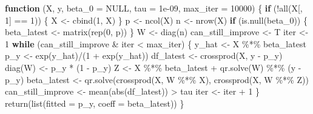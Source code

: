 \documentclass[
]{book}
\newenvironment{Shaded}{\begin{snugshade}}{\end{snugshade}}
\newcommand{\AttributeTok}[1]{\textcolor[rgb]{0.77,0.63,0.00}{#1}}
\newcommand{\ConstantTok}[1]{\textcolor[rgb]{0.00,0.00,0.00}{#1}}
\newcommand{\ControlFlowTok}[1]{\textcolor[rgb]{0.13,0.29,0.53}{\textbf{#1}}}
\newcommand{\DecValTok}[1]{\textcolor[rgb]{0.00,0.00,0.81}{#1}}
\newcommand{\FloatTok}[1]{\textcolor[rgb]{0.00,0.00,0.81}{#1}}
\newcommand{\FunctionTok}[1]{\textcolor[rgb]{0.00,0.00,0.00}{#1}}
\newcommand{\NormalTok}[1]{#1}
\newcommand{\OtherTok}[1]{\textcolor[rgb]{0.56,0.35,0.01}{#1}}
\newcommand{\SpecialCharTok}[1]{\textcolor[rgb]{0.00,0.00,0.00}{#1}}
\begin{document}
\begin{Shaded}
\begin{Highlighting}[]
\ControlFlowTok{function}\NormalTok{ (X, y, }\AttributeTok{beta\_0 =} \ConstantTok{NULL}\NormalTok{, }\AttributeTok{tau =} \FloatTok{1e{-}09}\NormalTok{, }\AttributeTok{max\_iter =} \DecValTok{10000}\NormalTok{) }
\NormalTok{\{}
    \ControlFlowTok{if}\NormalTok{ (}\SpecialCharTok{!}\FunctionTok{all}\NormalTok{(X[, }\DecValTok{1}\NormalTok{] }\SpecialCharTok{==} \DecValTok{1}\NormalTok{)) \{}
\NormalTok{        X }\OtherTok{\textless{}{-}} \FunctionTok{cbind}\NormalTok{(}\DecValTok{1}\NormalTok{, X)}
\NormalTok{    \}}
\NormalTok{    p }\OtherTok{\textless{}{-}} \FunctionTok{ncol}\NormalTok{(X)}
\NormalTok{    n }\OtherTok{\textless{}{-}} \FunctionTok{nrow}\NormalTok{(X)}
    \ControlFlowTok{if}\NormalTok{ (}\FunctionTok{is.null}\NormalTok{(beta\_0)) \{}
\NormalTok{        beta\_latest }\OtherTok{\textless{}{-}} \FunctionTok{matrix}\NormalTok{(}\FunctionTok{rep}\NormalTok{(}\DecValTok{0}\NormalTok{, p))}
\NormalTok{    \}}
\NormalTok{    W }\OtherTok{\textless{}{-}} \FunctionTok{diag}\NormalTok{(n)}
\NormalTok{    can\_still\_improve }\OtherTok{\textless{}{-}}\NormalTok{ T}
\NormalTok{    iter }\OtherTok{\textless{}{-}} \DecValTok{1}
    \ControlFlowTok{while}\NormalTok{ (can\_still\_improve }\SpecialCharTok{\&}\NormalTok{ iter }\SpecialCharTok{\textless{}}\NormalTok{ max\_iter) \{}
\NormalTok{        y\_hat }\OtherTok{\textless{}{-}}\NormalTok{ X }\SpecialCharTok{\%*\%}\NormalTok{ beta\_latest}
\NormalTok{        p\_y }\OtherTok{\textless{}{-}} \FunctionTok{exp}\NormalTok{(y\_hat)}\SpecialCharTok{/}\NormalTok{(}\DecValTok{1} \SpecialCharTok{+} \FunctionTok{exp}\NormalTok{(y\_hat))}
\NormalTok{        df\_latest }\OtherTok{\textless{}{-}} \FunctionTok{crossprod}\NormalTok{(X, y }\SpecialCharTok{{-}}\NormalTok{ p\_y)}
        \FunctionTok{diag}\NormalTok{(W) }\OtherTok{\textless{}{-}}\NormalTok{ p\_y }\SpecialCharTok{*}\NormalTok{ (}\DecValTok{1} \SpecialCharTok{{-}}\NormalTok{ p\_y)}
\NormalTok{        Z }\OtherTok{\textless{}{-}}\NormalTok{ X }\SpecialCharTok{\%*\%}\NormalTok{ beta\_latest }\SpecialCharTok{+} \FunctionTok{qr.solve}\NormalTok{(W) }\SpecialCharTok{\%*\%}\NormalTok{ (y }\SpecialCharTok{{-}}\NormalTok{ p\_y)}
\NormalTok{        beta\_latest }\OtherTok{\textless{}{-}} \FunctionTok{qr.solve}\NormalTok{(}\FunctionTok{crossprod}\NormalTok{(X, W }\SpecialCharTok{\%*\%}\NormalTok{ X), }\FunctionTok{crossprod}\NormalTok{(X, W }\SpecialCharTok{\%*\%}\NormalTok{ Z))}
\NormalTok{        can\_still\_improve }\OtherTok{\textless{}{-}} \FunctionTok{mean}\NormalTok{(}\FunctionTok{abs}\NormalTok{(df\_latest)) }\SpecialCharTok{\textgreater{}}\NormalTok{ tau}
\NormalTok{        iter }\OtherTok{\textless{}{-}}\NormalTok{ iter }\SpecialCharTok{+} \DecValTok{1}
\NormalTok{    \}}
    \FunctionTok{return}\NormalTok{(}\FunctionTok{list}\NormalTok{(}\AttributeTok{fitted =}\NormalTok{ p\_y, }\AttributeTok{coeff =}\NormalTok{ beta\_latest))}
\NormalTok{\}}
\end{Highlighting}
\end{Shaded}
\end{document}
